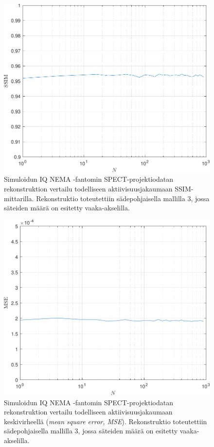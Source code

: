 \begin{figure}[H]
    \centering
    \captionsetup{width=.9\linewidth}
    \includegraphics[width=.9\linewidth]{kuvat/nema_vertailu_SSIM.pdf}
    \caption{Simuloidun IQ NEMA -fantomin SPECT-projektiodatan rekonstruktion vertailu todelliseen aktiivisuusjakaumaan SSIM-mittarilla. Rekonstruktio toteutettiin sädepohjaisella mallilla 3, jossa säteiden määrä on esitetty vaaka-akselilla.}
    \label{fig:vertailu_SSIM}
\end{figure}
\begin{figure}[H]
    \centering
    \captionsetup{width=.9\linewidth}
    \includegraphics[width=.9\linewidth]{kuvat/nema_vertailu_MSE.pdf}
    \caption{Simuloidun IQ NEMA -fantomin SPECT-projektiodatan rekonstruktion vertailu todelliseen aktiivisuusjakaumaan keskivirheellä (\textit{mean square error, MSE}). Rekonstruktio toteutettiin sädepohjaisella mallilla 3, jossa säteiden määrä on esitetty vaaka-akselilla.}
    \label{fig:vertailu_MSE}
\end{figure}

